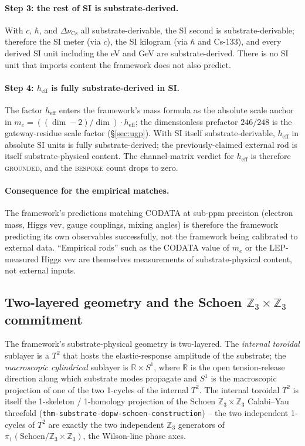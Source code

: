 ﻿\documentclass[reprint,amsmath,amssymb,aps,prd,longbibliography,floatfix]{revtex4-2}
\begin{document}
\paragraph{Step 3: the rest of SI is substrate-derived.} With $c$,
$\hbar$, and $\Delta\nu_\mathrm{Cs}$ all substrate-derivable, the SI
second is substrate-derivable; therefore the SI meter (via $c$), the
SI kilogram (via $\hbar$ and Cs-133), and every derived SI unit
including the eV and GeV are substrate-derived. There is no SI unit
that imports content the framework does not also predict.

\paragraph{Step 4: $h_\mathrm{eff}$ is fully substrate-derived in SI.}
The factor $h_\mathrm{eff}$ enters the framework's mass formula as the
absolute scale anchor in $m_e = ((\dim - 2)/\dim) \cdot h_\mathrm{eff}$;
the dimensionless prefactor $246/248$ is the gateway-residue scale
factor (\S\ref{sec:ugp}). With SI itself substrate-derivable,
$h_\mathrm{eff}$ in absolute SI units is fully substrate-derived; the
previously-claimed external rod is itself substrate-physical content.
The channel-matrix verdict for $h_\mathrm{eff}$ is therefore
\textsc{grounded}, and the \textsc{bespoke} count drops to zero.

\paragraph{Consequence for the empirical matches.} The framework's
predictions matching CODATA at sub-ppm precision (electron mass, Higgs
vev, gauge couplings, mixing angles) is therefore the framework
predicting its own observables successfully, not the framework being
calibrated to external data. ``Empirical rods'' such as the CODATA
value of $m_e$ or the LEP-measured Higgs vev are themselves
measurements of substrate-physical content, not external inputs.

\subsection{Two-layered geometry and the Schoen
$\mathbb{Z}_3 \times \mathbb{Z}_3$ commitment}
\label{sec:two-layered-geometry}

The framework's substrate-physical geometry is two-layered. The
\emph{internal toroidal} sublayer is a $T^2$ that hosts the
elastic-response amplitude of the substrate; the \emph{macroscopic
cylindrical} sublayer is $\mathbb{R} \times S^1$, where $\mathbb{R}$
is the open tension-release direction along which substrate modes
propagate and $S^1$ is the macroscopic projection of one of the two
1-cycles of the internal $T^2$. The internal toroidal $T^2$ is itself
the 1-skeleton / 1-homology projection of the Schoen
$\mathbb{Z}_3 \times \mathbb{Z}_3$ Calabi--Yau threefold
(\texttt{thm-substrate-dopw-schoen-construction}) -- the two
independent 1-cycles of $T^2$ are exactly the two independent
$\mathbb{Z}_3$ generators of $\pi_1(\mathrm{Schoen}/\mathbb{Z}_3
\times \mathbb{Z}_3)$, the Wilson-line phase axes.
\end{document}
